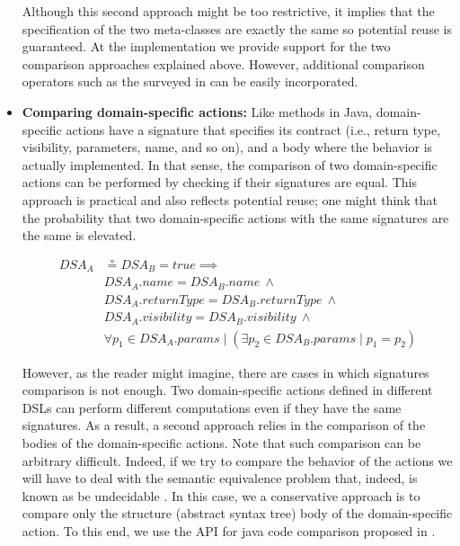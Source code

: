 \begin{itemize}
\vspace{2mm}
\hspace{3mm} Although this second approach might be too restrictive, it implies that the specification of the two meta-classes are exactly the same so potential reuse is guaranteed. At the implementation we provide support for the two comparison approaches explained above. However, additional comparison operators such as the surveyed in \cite{Lafi:2011} can be easily incorporated.

\vspace{2mm}

\item \textbf{Comparing domain-specific actions:} Like methods in Java, domain-specific actions have a signature that specifies its contract (i.e., return type, visibility, parameters, name, and so on), and a body where the behavior is actually implemented. In that sense, the comparison of two domain-specific actions can be performed by checking if their signatures are equal. This approach is practical and also reflects potential reuse; one might think that the probability that two domain-specific actions with the same signatures are the same is elevated.

\begin{equation}
\begin{split}
  DSA_{A} & \circeq DSA_{B} = true \implies \\
   & DSA_{A}.name = DSA_{B}.name ~ \wedge \\
   & DSA_{A}.returnType = DSA_{B}.returnType ~ \wedge \\
   & DSA_{A}.visibility = DSA_{B}.visibility ~ \wedge \\
   & \forall p_1 \in DSA_{A}.params \mid (\exists p_2 \in DSA_{B}.params \mid p_1 = p_2)
 \end{split}
\end{equation}

\vspace{2mm}
\hspace{3mm} However, as the reader might imagine, there are cases in which signatures comparison is not enough. Two domain-specific actions defined in different DSLs can perform different computations even if they have the same signatures. As a result, a second approach relies in the comparison of the bodies of the domain-specific actions. Note that such comparison can be arbitrary difficult. Indeed, if we try to compare  the behavior of the actions we will have to deal with the semantic equivalence problem that, indeed, is known as be undecidable \cite{Lucanu:2013}. In this case, we a conservative approach is to compare only the structure (abstract syntax tree) body of the domain-specific action. To this end, we use the API for java code comparison proposed in \cite{Biegel:2010}. 


\end{itemize}

